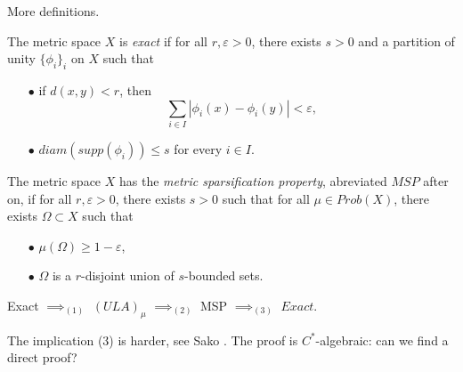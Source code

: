 More definitions.

\begin{definition} 
The metric space $X$ is \textit{exact} if for all $r,\varepsilon>0$, there exists $s>0$ and a partition of unity $\{\phi_i\}_i$ on $X$ such that
\begin{itemize}
\item[$\bullet$] if $d(x,y) < r$, then 
\[ \sum_{i\in I} |\phi_i(x) - \phi_i(y)| < \varepsilon ,\] 
\item[$\bullet$] $diam( supp(\phi_i)) \leq s$ for every $i\in I$.
\end{itemize}
\end{definition}

\begin{definition}
The metric space $X$ has the \textit{metric sparsification property}, abreviated $MSP$ after on, if for all $r,\varepsilon>0$, there exists $s>0$ such that for all $\mu \in Prob (X)$, there exists $\Omega \subset X$ such that
\begin{itemize}
\item[$\bullet$] $\mu (\Omega) \geq 1- \varepsilon$,  
\item[$\bullet$] $\Omega$ is a $r$-disjoint union of $s$-bounded sets.
\end{itemize}
\end{definition}

\begin{thm}
Exact $\implies_{(1)}$ $(ULA)_\mu$ $\implies_{(2)}$ MSP $\implies_{(3)}$ $Exact$.
\end{thm}

The implication (3) is harder, see Sako \cite{sako2013property}. The proof is $C^*$-algebraic: can we find a direct proof?

